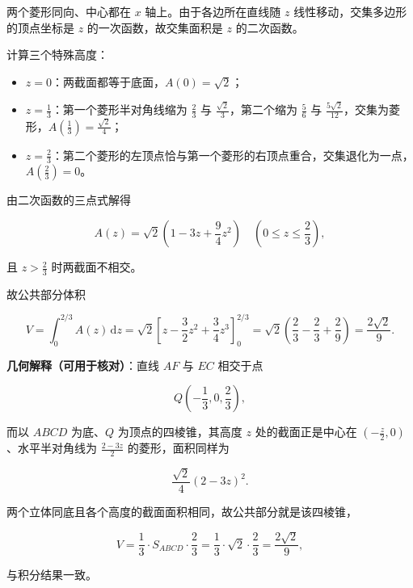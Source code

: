 \begin{answer}
两个菱形同向、中心都在 $x$ 轴上。由于各边所在直线随 $z$ 线性移动，交集多边形的顶点坐标是 $z$ 的一次函数，故交集面积是 $z$ 的二次函数。

计算三个特殊高度：

\begin{itemize}
\item $z=0$：两截面都等于底面，$A(0)=\sqrt2$；
\item $z=\frac13$：第一个菱形半对角线缩为 $\frac23$ 与 $\frac{\sqrt2}{3}$，第二个缩为 $\frac56$ 与 $\frac{5\sqrt2}{12}$，交集为菱形，$A\left(\frac13\right)=\frac{\sqrt2}{4}$；
\item $z=\frac23$：第二个菱形的左顶点恰与第一个菱形的右顶点重合，交集退化为一点，$A\left(\frac23\right)=0$。
\end{itemize}

由二次函数的三点式解得

\nopagebreak[4]
\[A(z)=\sqrt2\left(1-3z+\frac94z^2\right)\quad\left(0\leqslant z\leqslant\frac23\right),\]

且 $z>\frac23$ 时两截面不相交。

故公共部分体积

\nopagebreak[4]
\[V=\int_0^{2/3}A(z)\,\mathrm dz
=\sqrt2\left[z-\frac32z^2+\frac34z^3\right]_0^{2/3}
=\sqrt2\left(\frac23-\frac23+\frac29\right)=\frac{2\sqrt2}{9}.\]

\textbf{几何解释（可用于核对）}：直线 $AF$ 与 $EC$ 相交于点

\nopagebreak[4]
\[Q\left(-\frac13,0,\frac23\right),\]

而以 $ABCD$ 为底、$Q$ 为顶点的四棱锥，其高度 $z$ 处的截面正是中心在 $\left(-\frac z2,0\right)$、水平半对角线为 $\frac{2-3z}{2}$ 的菱形，面积同样为

\nopagebreak[4]
\[\frac{\sqrt2}{4}(2-3z)^2 .\]

两个立体同底且各个高度的截面面积相同，故公共部分就是该四棱锥，

\nopagebreak[4]
\[V=\frac13\cdot S_{ABCD}\cdot\frac23=\frac13\cdot\sqrt2\cdot\frac23=\frac{2\sqrt2}{9},\]

与积分结果一致。


\end{answer}
